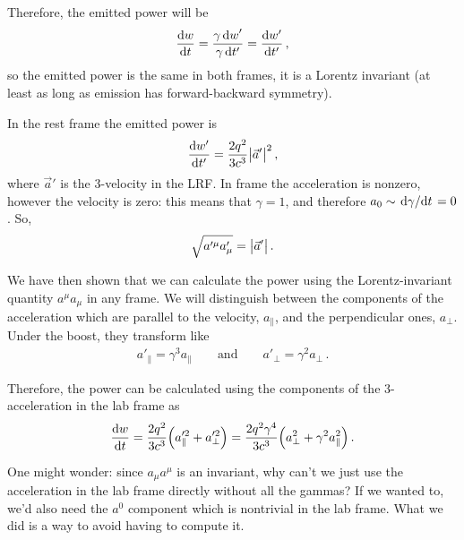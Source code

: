 \documentclass[main.tex]{subfiles}
\begin{document}
Therefore, the emitted power will be 
%
\begin{align}
\dv{w}{t} = \frac{ \gamma \dd{w}'}{ \gamma \dd{t'}} = \dv{w'}{t'}
\,,
\end{align}
%
so the emitted power is the same in both frames, it is a Lorentz invariant (at least as long as emission has forward-backward symmetry). 

In the rest frame the emitted power is 
%
\begin{align}
\dv{w'}{t'} = \frac{2 q^2}{3c^3} \abs{\vec{a}'}^2
\,,
\end{align}
%
where \(\vec{a}'\) is the 3-velocity in the LRF. In frame the acceleration is nonzero, however the velocity is zero: this means that \(\gamma = 1\), and therefore \(a_0 \sim \dv*{\gamma }{t} = 0\). So, 
%
\begin{align}
\sqrt{a^{\prime \mu } a^{\prime }_{\mu }} = \abs{\vec{a}'}
\,.
\end{align}

We have then shown that we can calculate the power using the Lorentz-invariant quantity \(a^{\mu } a_{\mu }\) in any frame. 
We will distinguish between the components of the acceleration which are parallel to the velocity, \(a_{\parallel}\), and the perpendicular ones, \(a_{\perp}\). 
Under the boost, they transform like 
%
\begin{align}
a'_{\parallel} = \gamma^3 a_{\parallel}
\qquad \text{and} \qquad
a'_{\perp} = \gamma^2 a_\perp
\,.
\end{align}
 
Therefore, the power can be calculated using the components of the 3-acceleration in the lab frame as 
%
\begin{align}
\dv{w}{t} = \frac{2 q^2}{3c^3} \qty(a^{\prime 2}_{\parallel} + a^{\prime 2}_{\perp}) = \frac{2 q^2 \gamma^{4}}{3 c^3} \qty(a^2_{\perp} + \gamma^2 a^2_{\parallel})
\,.
\end{align}

One might wonder: since \(a_{\mu } a^{\mu }\) is an invariant, why can't we just use the acceleration in the lab frame directly without all the gammas? If we wanted to, we'd also need the \(a^{0}\) component which is nontrivial in the lab frame. What we did is a way to avoid having to compute it. 
\end{document}
